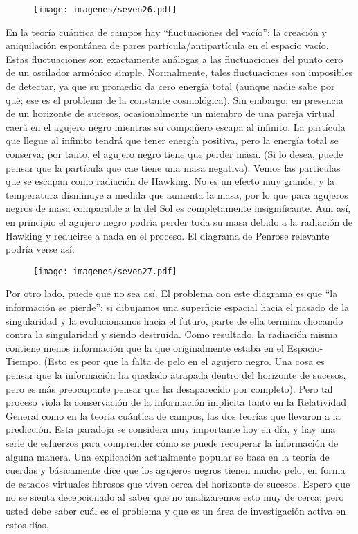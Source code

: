 \documentclass[11pt,b5paper,openany,twoside]{book}
\begin{document}
\begin{figure}[h]
\centering
\texttt{[image: imagenes/seven26.pdf]}
\end{figure}
En la teoría cuántica de campos hay ``fluctuaciones del vacío'': la creación y aniquilación espontánea de pares partícula/antipartícula en el espacio vacío.
Estas fluctuaciones son exactamente análogas a las fluctuaciones del punto cero de un oscilador armónico simple.
Normalmente, tales fluctuaciones son imposibles de detectar, ya que su promedio da cero energía total (aunque nadie sabe por qué; ese es el problema de la constante cosmológica).
Sin embargo, en presencia de un horizonte de sucesos, ocasionalmente un miembro de una pareja virtual caerá en el agujero negro mientras su compañero escapa al infinito.
La partícula que llegue al infinito tendrá que tener energía positiva, pero la energía total se conserva; por tanto, el agujero negro tiene que perder masa.
(Si lo desea, puede pensar que la partícula que cae tiene una masa negativa).
Vemos las partículas que se escapan como radiación de Hawking.
No es un efecto muy grande, y la temperatura disminuye a medida que aumenta la masa, por lo que para agujeros negros de masa comparable a la del Sol es completamente insignificante.
Aun así, en principio el agujero negro podría perder toda su masa debido a la radiación de Hawking y reducirse a nada en el proceso.
El diagrama de Penrose relevante podría verse así:

\begin{figure}[h]
\centering
\texttt{[image: imagenes/seven27.pdf]}
\end{figure}

Por otro lado, puede que no sea así.
El problema con este diagrama es que ``la información se pierde'': si dibujamos una superficie espacial hacia el pasado de la singularidad y la evolucionamos hacia el futuro, parte de ella termina chocando contra la singularidad y siendo destruida.
Como resultado, la radiación misma contiene menos información que la que originalmente estaba en el Espacio-Tiempo.
(Esto es peor que la falta de pelo en el agujero negro.
Una cosa es pensar que la información ha quedado atrapada dentro del horizonte de sucesos, pero es más preocupante pensar que ha desaparecido por completo).
Pero tal proceso viola la conservación de la información implícita tanto en la Relatividad General como en la teoría cuántica de campos, las dos teorías que llevaron a la predicción.
Esta paradoja se considera muy importante hoy en día, y hay una serie de esfuerzos para comprender cómo se puede recuperar la información de alguna manera.
Una explicación actualmente popular se basa en la teoría de cuerdas y básicamente dice que los agujeros negros tienen mucho pelo, en forma de estados virtuales fibrosos que viven cerca del horizonte de sucesos.
Espero que no se sienta decepcionado al saber que no analizaremos esto muy de cerca; pero usted debe saber cuál es el problema y que es un área de investigación activa en estos días.
\end{document}
